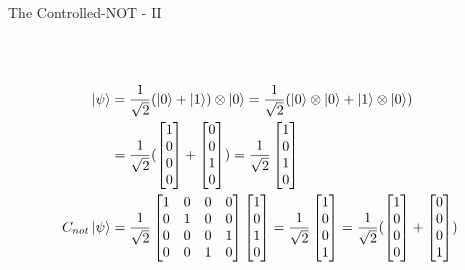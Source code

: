 \documentclass{beamer}
\begin{document}
\begin{frame}{The Controlled-NOT - II}
{\begin{columns}[t]
\begin{align*}
    \end{align*}
    \end{columns}
    \begin{align*}
      \ket\psi &= \frac{1}{\sqrt2} (\ket0 + \ket1) \otimes \ket0 = \frac{1}{\sqrt2} (\ket0 \otimes \ket0 + \ket1 \otimes \ket0) \\
      &= \frac{1}{\sqrt2} (\begin{bmatrix} 1 \\ 0 \\ 0 \\ 0 \end{bmatrix}  + \begin{bmatrix} 0 \\ 0 \\ 1 \\ 0 \end{bmatrix})
       = \frac{1}{\sqrt2} \begin{bmatrix} 1 \\ 0 \\ 1 \\ 0 \end{bmatrix} \\
      C_{not}\ket\psi &=
      \frac{1}{\sqrt2} \begin{bmatrix} 1 & 0 & 0 & 0 \\ 0 & 1 & 0 & 0 \\ 0 & 0 & 0 & 1 \\ 0 & 0 & 1 & 0 \end{bmatrix}  
                       \begin{bmatrix} 1 \\ 0 \\ 1 \\ 0 \end{bmatrix}
      = \frac{1}{\sqrt2} \begin{bmatrix} 1 \\ 0 \\ 0 \\ 1 \end{bmatrix}
      = \frac{1}{\sqrt2} (\begin{bmatrix} 1 \\ 0 \\ 0 \\ 0 \end{bmatrix} + \begin{bmatrix} 0 \\ 0 \\ 0 \\ 1 \end{bmatrix}) \\

\end{align*}}
\end{frame}
\end{document}
